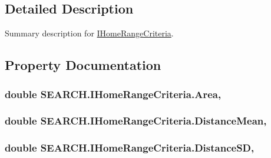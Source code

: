 \subsection{Detailed Description}
Summary description for \hyperlink{interface_s_e_a_r_c_h_1_1_i_home_range_criteria}{I\-Home\-Range\-Criteria}. 



\subsection{Property Documentation}
\hypertarget{interface_s_e_a_r_c_h_1_1_i_home_range_criteria_a9d4d6a0c16b83d50adaedc45aa4f679d}{
\subsubsection[{Area}]{\setlength{\rightskip}{0pt plus 5cm}double S\-E\-A\-R\-C\-H.\-I\-Home\-Range\-Criteria.\-Area\hspace{0.3cm}{\ttfamily [get]}, {\ttfamily [set]}}}\label{interface_s_e_a_r_c_h_1_1_i_home_range_criteria_a9d4d6a0c16b83d50adaedc45aa4f679d}
\hypertarget{interface_s_e_a_r_c_h_1_1_i_home_range_criteria_a430d7f41fbeb75e48cf015fd44a27d6b}{
\subsubsection[{Distance\-Mean}]{\setlength{\rightskip}{0pt plus 5cm}double S\-E\-A\-R\-C\-H.\-I\-Home\-Range\-Criteria.\-Distance\-Mean\hspace{0.3cm}{\ttfamily [get]}, {\ttfamily [set]}}}\label{interface_s_e_a_r_c_h_1_1_i_home_range_criteria_a430d7f41fbeb75e48cf015fd44a27d6b}
\hypertarget{interface_s_e_a_r_c_h_1_1_i_home_range_criteria_a3a4572f0dcfd2b11d39d8a95ca1650b6}{
\subsubsection[{Distance\-S\-D}]{\setlength{\rightskip}{0pt plus 5cm}double S\-E\-A\-R\-C\-H.\-I\-Home\-Range\-Criteria.\-Distance\-S\-D\hspace{0.3cm}{\ttfamily [get]}, {\ttfamily [set]}}}\label{interface_s_e_a_r_c_h_1_1_i_home_range_criteria_a3a4572f0dcfd2b11d39d8a95ca1650b6}
